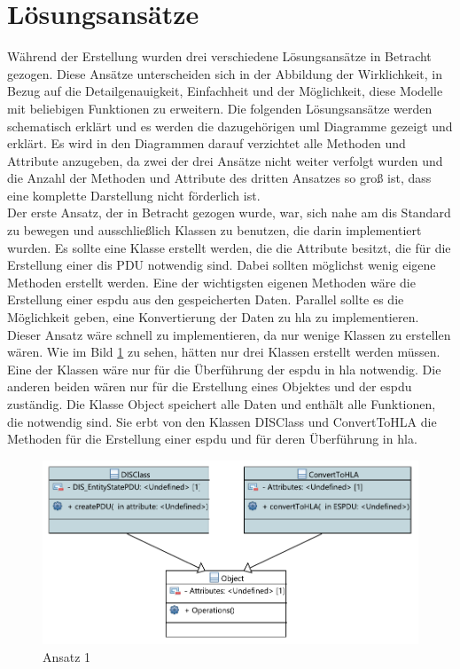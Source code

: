 \section{Lösungsansätze}\label{lös}
Während der Erstellung wurden drei verschiedene Lösungsansätze in Betracht gezogen.
Diese Ansätze unterscheiden sich in der Abbildung der Wirklichkeit, in Bezug auf die Detailgenauigkeit, Einfachheit und der Möglichkeit, diese Modelle mit beliebigen Funktionen zu erweitern. Die folgenden Lösungsansätze werden schematisch erklärt und es werden die dazugehörigen \ac{uml} Diagramme gezeigt und erklärt. Es wird in den Diagrammen darauf verzichtet alle Methoden und Attribute anzugeben, da zwei der drei Ansätze nicht weiter verfolgt wurden und die Anzahl der Methoden und Attribute des dritten Ansatzes so groß ist, dass eine komplette Darstellung nicht förderlich ist.\\
Der erste Ansatz, der in Betracht gezogen wurde, war, sich nahe am \ac{dis} Standard zu bewegen und ausschließlich Klassen zu benutzen, die darin implementiert wurden. Es sollte eine Klasse erstellt werden, die die Attribute besitzt, die für die Erstellung einer \ac{dis} PDU notwendig sind. Dabei sollten möglichst wenig eigene Methoden erstellt werden. Eine der wichtigsten eigenen Methoden wäre die Erstellung einer \ac{espdu} aus den gespeicherten Daten. Parallel sollte es die Möglichkeit geben, eine Konvertierung der Daten zu \ac{hla} zu implementieren. Dieser Ansatz wäre schnell zu implementieren, da nur wenige Klassen zu erstellen wären.  Wie im Bild \ref{ansatz1} zu sehen, hätten nur drei Klassen erstellt werden müssen. Eine der Klassen wäre nur für die Überführung der \ac{espdu} in \ac{hla} notwendig. Die anderen beiden wären nur für die Erstellung eines Objektes und der \ac{espdu} zuständig. 
Die Klasse \glqq Object\grqq{} speichert alle Daten und enthält alle Funktionen, die notwendig sind. Sie erbt von den Klassen  \glqq DISClass\grqq{} und  \glqq ConvertToHLA\grqq{} die Methoden für die Erstellung einer \ac{espdu} und für deren Überführung in \ac{hla}. 
 \begin{figure}[H]
	\centering
	\includegraphics[scale=0.9]{bilder/pdfvorlagen/ansatz2}
	\caption[Ansatz 1]{Ansatz 1}
	\label{ansatz1}
\end{figure}
